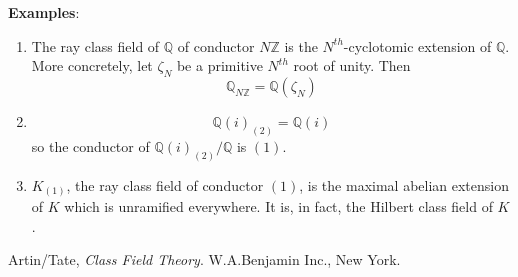 \documentclass[12pt]{article}
\newcommand{\Ints}{\mathbb{Z}}
\newcommand{\Rats}{\mathbb{Q}}
\begin{document}
{\bf Examples}:
\begin{enumerate}
\item The ray class field of $\Rats$ of conductor $N\Ints$ is the
$N^{th}$-cyclotomic extension of $\Rats$. More concretely, let
$\zeta_N$ be a primitive $N^{th}$ root of unity. Then
$$\Rats_{N\Ints}=\Rats(\zeta_N)$$

\item $$\Rats(i)_{(2)}=\Rats(i)$$ so the conductor of
$\Rats(i)_{(2)}/\Rats$ is $(1)$.

\item $K_{(1)}$, the ray class field of conductor $(1)$, is the
maximal abelian extension of $K$ which is unramified everywhere.
It is, in fact, the Hilbert class field of $K$.
\end{enumerate}

\begin{thebibliography}{9}
 Artin/Tate, {\em Class Field Theory}. W.A.Benjamin Inc., New York.
\end{thebibliography}
\end{document}

